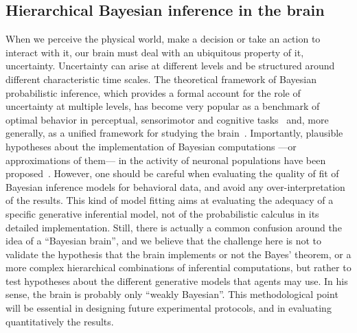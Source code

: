 \documentclass[10pt,letterpaper]{article}
\newcommand{\citep}[1]{\cite{#1}}
\newcommand{\AM}[1]{\textbf{\textcolor{blue}{[AM: #1]}}}
\begin{document}
\subsection{Hierarchical Bayesian inference in the brain}
When we perceive the physical world, make a decision or take an action to interact with it, our brain must deal with an ubiquitous property of it, uncertainty. Uncertainty can arise at different levels and be structured around different characteristic time scales. %
The theoretical framework of Bayesian probabilistic inference, which provides a formal account for the role of uncertainty at multiple levels, %
has become very popular as a benchmark of optimal behavior in perceptual, sensorimotor and cognitive tasks~\citep{KnillPouget2004} and, more generally, as a unified framework for studying the brain~\citep{Friston2010}. Importantly, plausible hypotheses about the implementation of Bayesian computations ---or approximations of them--- in the activity of neuronal populations have been proposed~\citep{Bastos12, Fetsch2012,Ma2006}. However, one should be careful when evaluating the quality of fit of Bayesian inference models for behavioral data, and avoid any over-interpretation of the results. This kind of model fitting aims at evaluating the adequacy of a specific generative inferential model, not of the probabilistic calculus in its detailed implementation.
Still, there is actually a common confusion around the idea of a ``Bayesian brain'', and
we believe that the challenge here is not to validate the hypothesis that the brain implements or not the Bayes' theorem, or a more complex hierarchical combinations of inferential computations, but rather to test hypotheses about the different generative models
that agents may use. In his sense, the brain is probably only ``weakly Bayesian''. This methodological point will be essential in designing future experimental protocols, and in evaluating quantitatively the results.
\end{document}
